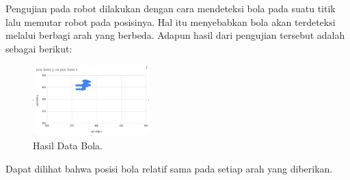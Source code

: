 Pengujian pada robot dilakukan dengan cara mendeteksi bola pada suatu titik lalu memutar robot pada posisinya. Hal itu menyebabkan bola akan terdeteksi melalui berbagi arah yang berbeda. Adapun hasil dari pengujian tersebut adalah sebagai berikut: 

\begin{figure}
    \centering
    \includegraphics[width=0.4\textwidth]{gambar/putar_bola.png}
  
    \caption{Hasil Data Bola.}
    \label{fig:databola}
\end{figure} 

Dapat dilihat bahwa posisi bola relatif sama pada setiap arah yang diberikan.


